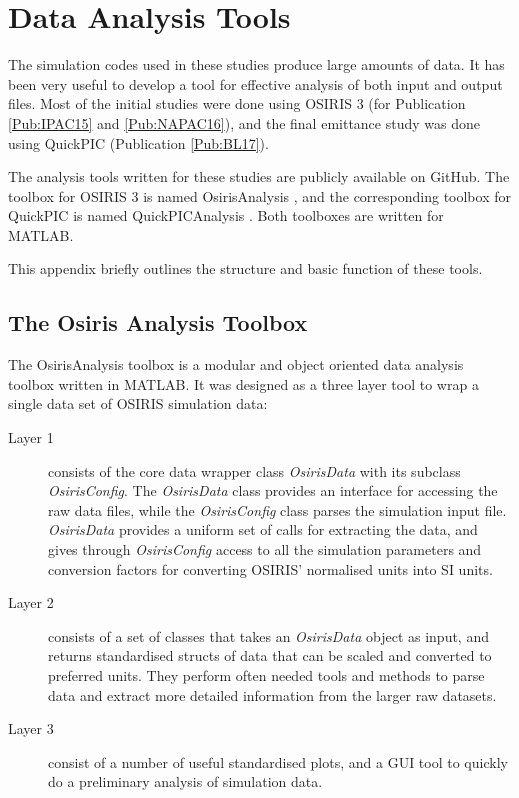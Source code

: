%
%

\chapter{Data Analysis Tools}
\label{Apx:DA}

The simulation codes used in these studies produce large amounts of data.
It has been very useful to develop a tool for effective analysis of both input and output files.
Most of the initial studies were done using OSIRIS 3 (for Publication \ref{Pub:IPAC15} and \ref{Pub:NAPAC16}), and the final emittance study was done using QuickPIC (Publication \ref{Pub:BL17}).

The analysis tools written for these studies are publicly available on GitHub.
The toolbox for OSIRIS 3 is named OsirisAnalysis \cite{code:osiris_analysis:2013}, and the corresponding toolbox for QuickPIC is named QuickPICAnalysis \cite{code:quickpic_analysis:2017}.
Both toolboxes are written for MATLAB.

This appendix briefly outlines the structure and basic function of these tools.


\section{The Osiris Analysis Toolbox}
\label{Tools:OA}

The OsirisAnalysis toolbox is a modular and object oriented data analysis toolbox written in MATLAB.
It was designed as a three layer tool to wrap a single data set of OSIRIS simulation data:

\begin{description}
    \item[Layer 1] consists of the core data wrapper class \emph{OsirisData} with its subclass \emph{OsirisConfig}.
        The \emph{OsirisData} class provides an interface for accessing the raw data files, while the \emph{OsirisConfig} class parses the simulation input file.
        \emph{OsirisData} provides a uniform set of calls for extracting the data, and gives through \emph{OsirisConfig} access to all the simulation parameters and conversion factors for converting OSIRIS' normalised units into SI units.
    \item[Layer 2] consists of a set of classes that takes an \emph{OsirisData} object as input, and returns standardised structs of data that can be scaled and converted to preferred units.
    They perform often needed tools and methods to parse data and extract more detailed information from the larger raw datasets.
    \item[Layer 3] consist of a number of useful standardised plots, and a GUI tool to quickly do a preliminary analysis of simulation data.
\end{description}

